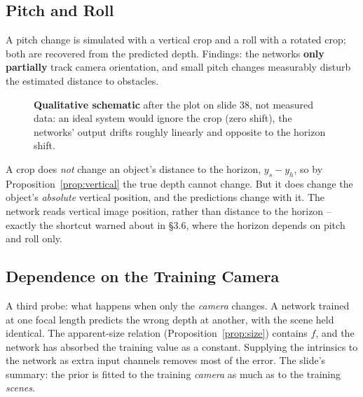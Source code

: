 \documentclass[11pt,a4paper]{article}
\theoremstyle{definition}
\theoremstyle{plain}
\theoremstyle{remark}
\begin{document}
\subsection{Pitch and Roll }
 
A pitch change is simulated with a vertical crop and a roll with a rotated crop; both are recovered from the predicted depth. Findings: the networks \textbf{only partially} track camera orientation, and small pitch changes measurably disturb the estimated distance to obstacles.
 
\begin{figure}[htbp]
\centering
{}
\caption{\textbf{Qualitative schematic} after the plot on slide 38, not measured data: an ideal system would ignore the crop (zero shift), the networks' output drifts roughly linearly and opposite to the horizon shift.}
\end{figure}
 
\begin{intuition}
A crop does \emph{not} change an object's distance to the horizon, $y_s-y_h$, so by Proposition~\ref{prop:vertical} the true depth cannot change. But it does change the object's \emph{absolute} vertical position, and the predictions change with it. The network reads vertical image position, rather than distance to the horizon -- exactly the shortcut warned about in \S3.6, where the horizon depends on pitch and roll only.
\end{intuition}
 
\subsection{Dependence on the Training Camera }
 
A third probe: what happens when only the \emph{camera} changes. A network trained at one focal length predicts the wrong depth at another, with the scene held identical. The apparent-size relation (Proposition~\ref{prop:size}) contains $f$, and the network has absorbed the training value as a constant. Supplying the intrinsics to the network as extra input channels removes most of the error. The slide's summary: the prior is fitted to the training \emph{camera} as much as to the training \emph{scenes}.
 
\end{document}

